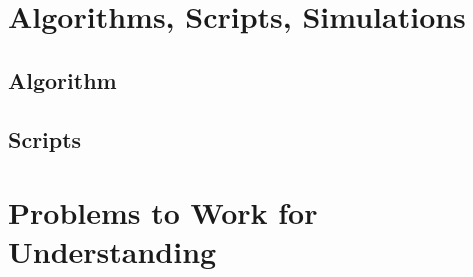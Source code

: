 \documentclass[12pt]{article}
\begin{document}
\section*{Algorithms, Scripts, Simulations}

\subsection*{Algorithm}

\subsection*{Scripts}

% 

\hr

\section*{Problems to Work for Understanding}
\renewcommand{\theexerciseseries}{}
\renewcommand{\theexercise}{\arabic{exercise}}
\end{document}
